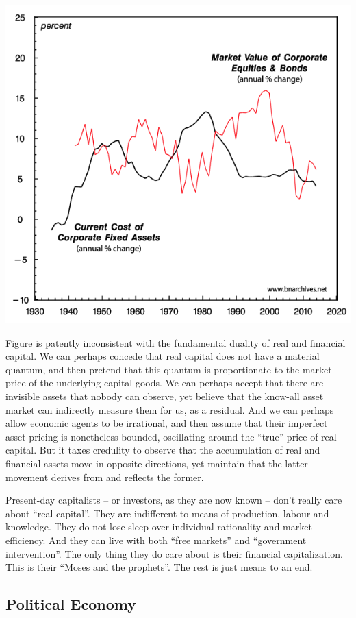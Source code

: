 \documentclass[
]{book}
\begin{document}
\includegraphics{fig/Capital_Accumulation_US.png}

Figure is patently inconsistent with the fundamental duality of real and financial capital. We can perhaps concede that real capital does not have a material quantum, and then pretend that this quantum is proportionate to the market price of the underlying capital goods. We can perhaps accept that there are invisible assets that nobody can observe, yet believe that the know-all asset market can indirectly measure them for us, as a residual. And we can perhaps allow economic agents to be irrational, and then assume that their imperfect asset pricing is nonetheless bounded, oscillating around the ``true'' price of real capital. But it taxes credulity to observe that the accumulation of real and financial assets move in opposite directions, yet maintain that the latter movement derives from and reflects the former.

Present-day capitalists -- or investors, as they are now known -- don't really care about ``real capital''. They are indifferent to means of production, labour and knowledge. They do not lose sleep over individual rationality and market efficiency. And they can live with both ``free markets'' and ``government intervention''. The only thing they do care about is their financial capitalization. This is their ``Moses and the prophets''. The rest is just means to an end.

\hypertarget{political-economy}{%
\subsection{Political Economy}\label{political-economy}}
\end{document}
